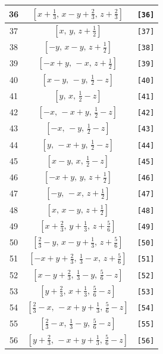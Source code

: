 \documentclass[fleqn,8pt]{jsarticle}
\begin{document}
\begin{longtable}{ccc}
36 & $\left[ x + \frac{1}{3},\, x - y + \frac{2}{3},\, z + \frac{2}{3} \right]$ & {\tt [36]} \\ \hline
37 & $\left[ x,\, y,\, z + \frac{1}{2} \right]$ & {\tt [37]} \\ \hline
38 & $\left[ - y,\, x - y,\, z + \frac{1}{2} \right]$ & {\tt [38]} \\ \hline
39 & $\left[ - x + y,\, - x,\, z + \frac{1}{2} \right]$ & {\tt [39]} \\ \hline
40 & $\left[ x - y,\, - y,\, \frac{1}{2} - z \right]$ & {\tt [40]} \\ \hline
41 & $\left[ y,\, x,\, \frac{1}{2} - z \right]$ & {\tt [41]} \\ \hline
42 & $\left[ - x,\, - x + y,\, \frac{1}{2} - z \right]$ & {\tt [42]} \\ \hline
43 & $\left[ - x,\, - y,\, \frac{1}{2} - z \right]$ & {\tt [43]} \\ \hline
44 & $\left[ y,\, - x + y,\, \frac{1}{2} - z \right]$ & {\tt [44]} \\ \hline
45 & $\left[ x - y,\, x,\, \frac{1}{2} - z \right]$ & {\tt [45]} \\ \hline
46 & $\left[ - x + y,\, y,\, z + \frac{1}{2} \right]$ & {\tt [46]} \\ \hline
47 & $\left[ - y,\, - x,\, z + \frac{1}{2} \right]$ & {\tt [47]} \\ \hline
48 & $\left[ x,\, x - y,\, z + \frac{1}{2} \right]$ & {\tt [48]} \\ \hline
49 & $\left[ x + \frac{2}{3},\, y + \frac{1}{3},\, z + \frac{5}{6} \right]$ & {\tt [49]} \\ \hline
50 & $\left[ \frac{2}{3} - y,\, x - y + \frac{1}{3},\, z + \frac{5}{6} \right]$ & {\tt [50]} \\ \hline
51 & $\left[ - x + y + \frac{2}{3},\, \frac{1}{3} - x,\, z + \frac{5}{6} \right]$ & {\tt [51]} \\ \hline
52 & $\left[ x - y + \frac{2}{3},\, \frac{1}{3} - y,\, \frac{5}{6} - z \right]$ & {\tt [52]} \\ \hline
53 & $\left[ y + \frac{2}{3},\, x + \frac{1}{3},\, \frac{5}{6} - z \right]$ & {\tt [53]} \\ \hline
54 & $\left[ \frac{2}{3} - x,\, - x + y + \frac{1}{3},\, \frac{5}{6} - z \right]$ & {\tt [54]} \\ \hline
55 & $\left[ \frac{2}{3} - x,\, \frac{1}{3} - y,\, \frac{5}{6} - z \right]$ & {\tt [55]} \\ \hline
56 & $\left[ y + \frac{2}{3},\, - x + y + \frac{1}{3},\, \frac{5}{6} - z \right]$ & {\tt [56]} \\ \hline

\end{longtable}
\end{document}
